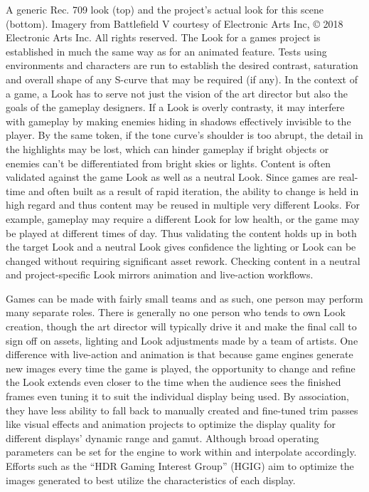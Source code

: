 A generic Rec. 709 look (top) and the project’s actual look for this scene (bottom). 
Imagery from Battlefield V courtesy of Electronic Arts Inc, © 2018 Electronic Arts Inc. All rights reserved.
The Look for a games project is established in much the same way as for an animated feature. Tests using environments and characters are run to establish the desired contrast, saturation and overall shape of any S-curve that may be required (if any). In the context of a game, a Look has to serve not just the vision of the art director but also the goals of the gameplay designers. If a Look is overly contrasty, it may interfere with gameplay by making enemies hiding in shadows effectively invisible to the player. By the same token, if the tone curve’s shoulder is too abrupt, the detail in the highlights may be lost, which can hinder gameplay if bright objects or enemies can’t be differentiated from bright skies or lights. Content is often validated against the game Look as well as a neutral Look. Since games are real-time and often built as a result of rapid iteration, the ability to change is held in high regard and thus content may be reused in multiple very different Looks. For example, gameplay may require a different Look for low health, or the game may be played at different times of day. Thus validating the content holds up in both the target Look and a neutral Look gives confidence the lighting or Look can be changed without requiring significant asset rework. Checking content in a neutral and project-specific Look mirrors animation and live-action workflows.

Games can be made with fairly small teams and as such, one person may perform many separate roles. There is generally no one person who tends to own Look creation, though the art director will typically drive it and make the final call to sign off on assets, lighting and Look adjustments made by a team of artists. One difference with live-action and animation is that because game engines generate new images every time the game is played, the opportunity to change and refine the Look extends even closer to the time when the audience sees the finished frames even tuning it to suit the individual display being used. By association, they have less ability to fall back to manually created and fine-tuned trim passes like visual effects and animation projects to optimize the display quality for different displays’ dynamic range and gamut. Although broad operating parameters can be set for the engine to work within and interpolate accordingly. Efforts such as the “HDR Gaming Interest Group” (HGIG) aim to optimize the images generated to best utilize the characteristics of each display.

